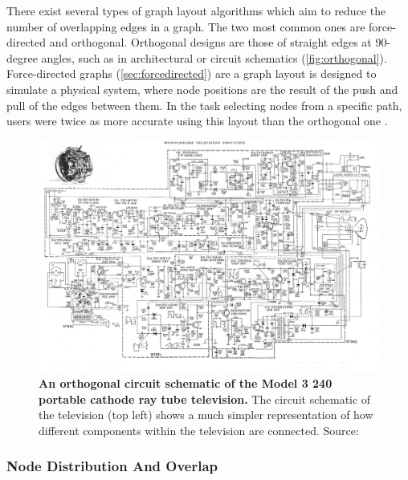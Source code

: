 There exist several types of graph layout algorithms which aim to reduce the number of overlapping edges in a graph. The two most common ones are force-directed and orthogonal. Orthogonal designs are those of straight edges at 90-degree angles, such as in architectural or circuit schematics (\autoref{fig:orthogonal}). Force-directed graphs (\autoref{sec:forcedirected}) are a graph layout is designed to simulate a physical system, where node positions are the result of the push and pull of the edges between them. In the task selecting nodes from a specific path, users were twice as more accurate using this layout than the orthogonal one \citep{eyetrack}.


\begin{figure}[H]
    \centering
        \includegraphics[width=\textwidth]{tvschematic.jpg}
       \caption{\textbf{An orthogonal circuit schematic of the Model 3 240 portable cathode ray tube television.} The circuit schematic of the television (top left) shows a much simpler representation of how different components within the television are connected.  Source: \citep{orthogonaltv} }
       \label{fig:orthogonal}
\end{figure}



    
 
\subsubsection{Node Distribution And Overlap}\label{sec:ndist}

